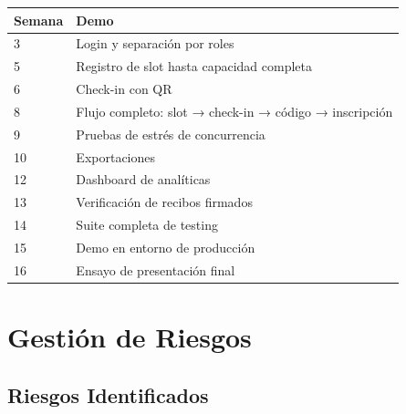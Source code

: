 \documentclass[12pt,a4paper]{article}
\begin{document}
\begin{table}[h]
\centering
\begin{tabular}{@{}lp{10cm}@{}}
\toprule
\textbf{Semana} & \textbf{Demo} \\
\midrule
3 & Login y separación por roles \\
5 & Registro de slot hasta capacidad completa \\
6 & Check-in con QR \\
8 & Flujo completo: slot → check-in → código → inscripción \\
9 & Pruebas de estrés de concurrencia \\
10 & Exportaciones \\
12 & Dashboard de analíticas \\
13 & Verificación de recibos firmados \\
14 & Suite completa de testing \\
15 & Demo en entorno de producción \\
16 & Ensayo de presentación final \\
\bottomrule
\end{tabular}
\end{table}

\section{Gestión de Riesgos}

\subsection{Riesgos Identificados}
\end{document}
